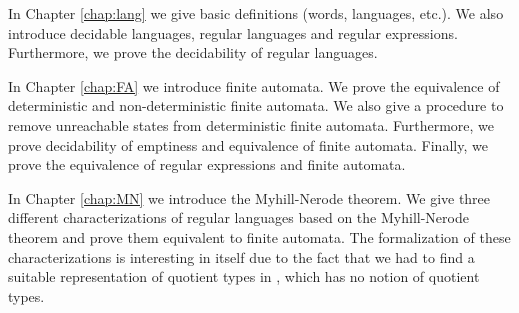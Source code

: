 In Chapter \ref{chap:lang} we give basic definitions (words, languages, etc.). 
We also introduce decidable languages, regular languages and regular expressions. 
Furthermore, we prove the decidability of regular languages.

In Chapter \ref{chap:FA} we introduce finite automata.
We prove the equivalence of deterministic and non-deterministic finite automata.
We also give a procedure to remove unreachable states from deterministic finite automata.
Furthermore, we prove decidability of emptiness and equivalence of finite automata.
Finally, we prove the equivalence of regular expressions and finite automata. 

In Chapter \ref{chap:MN} we introduce the Myhill-Nerode theorem.
We give three different characterizations of regular languages based on the Myhill-Nerode theorem and prove them equivalent to finite automata.
The formalization of these characterizations is interesting in itself due to the fact that we had to find a suitable representation of quotient types in \coq, which has no notion of quotient types.

